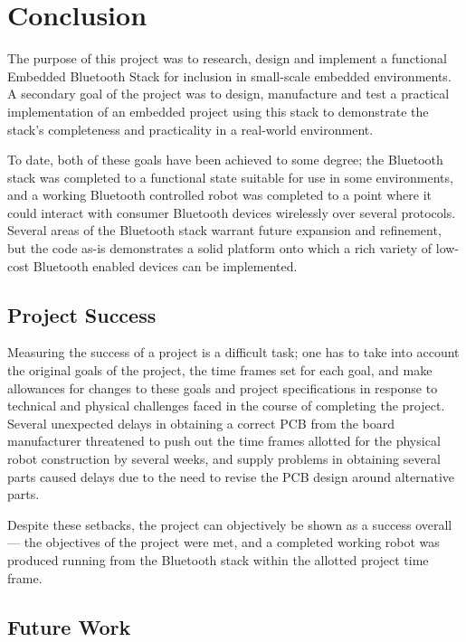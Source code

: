 \chapter{Conclusion}
\label{chp:conclusion}

The purpose of this project was to research, design and implement a functional Embedded Bluetooth Stack for inclusion in small-scale embedded environments. A secondary goal of the project was to design, manufacture and test a practical implementation of an embedded project using this stack to demonstrate the stack's completeness and practicality in a real-world environment.

To date, both of these goals have been achieved to some degree; the Bluetooth stack was completed to a functional state suitable for use in some environments, and a working Bluetooth controlled robot was completed to a point where it could interact with consumer Bluetooth devices wirelessly over several protocols. Several areas of the Bluetooth stack warrant future expansion and refinement, but the code as-is demonstrates a solid platform onto which a rich variety of low-cost Bluetooth enabled devices can be implemented.

\section{Project Success}

Measuring the success of a project is a difficult task; one has to take into account the original goals of the project, the time frames set for each goal, and make allowances for changes to these goals and project specifications in response to technical and physical challenges faced in the course of completing the project. Several unexpected delays in obtaining a correct PCB from the board manufacturer threatened to push out the time frames allotted for the physical robot construction by several weeks, and supply problems in obtaining several parts caused delays due to the need to revise the PCB design around alternative parts.

Despite these setbacks, the project can objectively be shown as a success overall --- the objectives of the project were met, and a completed working robot was produced running from the Bluetooth stack within the allotted project time frame.

\section{Future Work}


